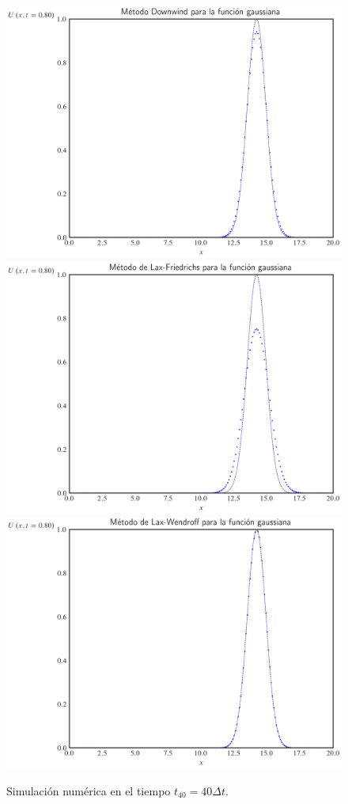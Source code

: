 \begin{figure}[ht!]
    \centering
    \includegraphics[width=.35\paperwidth]{../snapshots/downwindgaussian1d-40.png}
    \includegraphics[width=.35\paperwidth]{../snapshots/lax-friedrichsgaussiana1d-40.png}
    \includegraphics[width=.35\paperwidth]{../snapshots/lax-wendroffgaussiana1d-40.png}
    \caption{Simulación numérica en el tiempo $t_{40}=40\Delta t$.}
    \label{fig:example1t2}
\end{figure}

